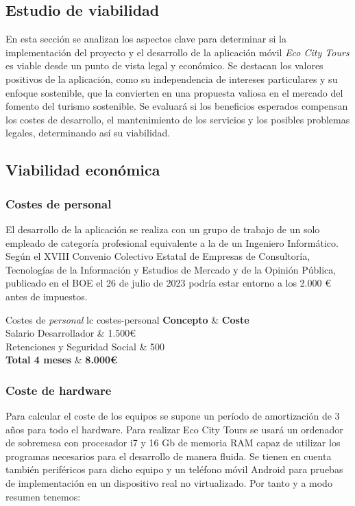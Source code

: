 \begin{enumerate}
\section{Estudio de viabilidad}
En esta sección se analizan los aspectos clave para determinar si la implementación del proyecto y el desarrollo de la aplicación móvil \textit{Eco City Tours} es viable desde un punto de vista legal y económico. Se destacan los valores positivos de la aplicación, como su independencia de intereses particulares y su enfoque sostenible, que la convierten en una propuesta valiosa en el mercado del fomento del turismo sostenible. Se evaluará si los beneficios esperados compensan los costes de desarrollo, el mantenimiento de los servicios y los posibles problemas legales, determinando así su viabilidad.
\subsection{Viabilidad económica}
\subsubsection{Costes de personal}
El desarrollo de la aplicación se realiza con un grupo de trabajo de un solo empleado de categoría profesional equivalente a la de un Ingeniero Informático. Según el XVIII Convenio Colectivo Estatal de Empresas de Consultoría, Tecnologías de la Información y Estudios de Mercado y de la Opinión Pública, publicado en el BOE el 26 de julio de 2023 \cite{boe2023_consultoria} podría estar entorno a los 2.000 € antes de impuestos.

\tablaSmallSinColores
{Costes de \textit{personal}} %
{lc} %
{costes-personal} %
{%
	\textbf{Concepto} & \textbf{Coste} \\ %
}
{%
	Salario Desarrollador & 1.500€  \\ 
	Retenciones y Seguridad Social & 500 \\
	\midrule
	\textbf{Total 4 meses} & \textbf{8.000€} \\ 
}

\subsubsection{Coste de hardware}
Para calcular el coste de los equipos se supone un período de amortización de 3 años para todo el hardware. Para realizar Eco City Tours se usará un ordenador de sobremesa con procesador i7 y 16 Gb de memoria RAM capaz de utilizar los programas necesarios para el desarrollo de manera fluida. Se tienen en cuenta también periféricos para dicho equipo y un teléfono móvil Android para pruebas de implementación en un dispositivo real no virtualizado. Por tanto y a modo resumen tenemos:


\end{enumerate}
